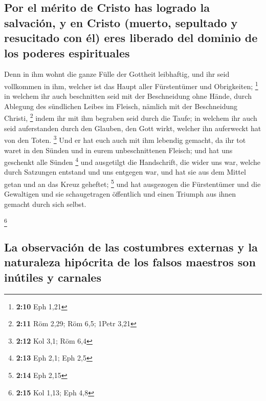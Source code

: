 \hypertarget{por-el-muxe9rito-de-cristo-has-logrado-la-salvaciuxf3n-y-en-cristo-muerto-sepultado-y-resucitado-con-uxe9l-eres-liberado-del-dominio-de-los-poderes-espirituales}{%
\subsection{Por el mérito de Cristo has logrado la salvación, y en
Cristo (muerto, sepultado y resucitado con él) eres liberado del dominio
de los poderes
espirituales}\label{por-el-muxe9rito-de-cristo-has-logrado-la-salvaciuxf3n-y-en-cristo-muerto-sepultado-y-resucitado-con-uxe9l-eres-liberado-del-dominio-de-los-poderes-espirituales}}

 Denn in ihm wohnt die ganze Fülle der Gottheit
leibhaftig,  und ihr seid vollkommen in ihm, welcher ist
das Haupt aller Fürstentümer und Obrigkeiten; \footnote{\textbf{2:10}
  Eph 1,21}  in welchem ihr auch beschnitten seid mit der
Beschneidung ohne Hände, durch Ablegung des sündlichen Leibes im
Fleisch, nämlich mit der Beschneidung Christi, \footnote{\textbf{2:11}
  Röm 2,29; Röm 6,5; 1Petr 3,21}  indem ihr mit ihm
begraben seid durch die Taufe; in welchem ihr auch seid auferstanden
durch den Glauben, den Gott wirkt, welcher ihn auferweckt hat von den
Toten. \footnote{\textbf{2:12} Kol 3,1; Röm 6,4}  Und er
hat euch auch mit ihm lebendig gemacht, da ihr tot waret in den Sünden
und in eurem unbeschnittenen Fleisch; und hat uns geschenkt alle Sünden
\footnote{\textbf{2:13} Eph 2,1; Eph 2,5}  und ausgetilgt
die Handschrift, die wider uns war, welche durch Satzungen entstand und
uns entgegen war, und hat sie aus dem Mittel getan und an das Kreuz
geheftet; \footnote{\textbf{2:14} Eph 2,15}  und hat
ausgezogen die Fürstentümer und die Gewaltigen und sie schaugetragen
öffentlich und einen Triumph aus ihnen gemacht durch sich selbst.

\footnote{\textbf{2:15} Kol 1,13; Eph 4,8}

\hypertarget{la-observaciuxf3n-de-las-costumbres-externas-y-la-naturaleza-hipuxf3crita-de-los-falsos-maestros-son-inuxfatiles-y-carnales}{%
\subsection{La observación de las costumbres externas y la naturaleza
hipócrita de los falsos maestros son inútiles y
carnales}\label{la-observaciuxf3n-de-las-costumbres-externas-y-la-naturaleza-hipuxf3crita-de-los-falsos-maestros-son-inuxfatiles-y-carnales}}

